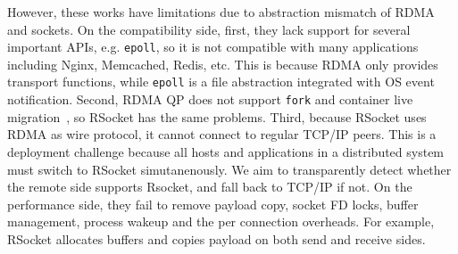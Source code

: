 However, these works have limitations due to abstraction mismatch of RDMA and sockets.
On the compatibility side, first, they lack support for several important APIs, e.g. \texttt{epoll}, so it is not compatible with many applications including Nginx, Memcached, Redis, etc.
This is because RDMA only provides transport functions, while \texttt{epoll} is a file abstraction integrated with OS event notification.
Second, RDMA QP does not support \texttt{fork} and container live migration~\cite{nsdi19freeflow}, so RSocket has the same problems.
Third, because RSocket uses RDMA as wire protocol, it cannot connect to regular TCP/IP peers.
This is a deployment challenge because all hosts and applications in a distributed system must switch to RSocket simutanenously.
We aim to transparently detect whether the remote side supports Rsocket, and fall back to TCP/IP if not.
On the performance side, they fail to remove payload copy, socket FD locks, buffer management, process wakeup and the per connection overheads.
For example, RSocket allocates buffers and copies payload on both send and receive sides.




